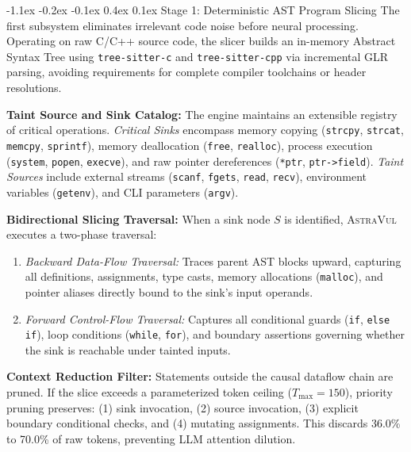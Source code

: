 \documentclass[10pt,twocolumn]{article}
\makeatletter
\renewcommand\subsection{\@startsection{subsection}{2}{\z@}%
  {-1.1ex \@plus -0.2ex \@minus -0.1ex}%
  {0.4ex \@plus 0.1ex}%
  {\normalfont\normalsize\bfseries}}
\makeatother
\begin{document}
\subsection{Stage 1: Deterministic AST Program Slicing}
The first subsystem eliminates irrelevant code noise before neural processing. Operating on raw C/C++ source code, the slicer builds an in-memory Abstract Syntax Tree using \texttt{tree-sitter-c} and \texttt{tree-sitter-cpp} via incremental GLR parsing, avoiding requirements for complete compiler toolchains or header resolutions.

\vspace{1pt}\noindent\textbf{Taint Source and Sink Catalog:}
The engine maintains an extensible registry of critical operations. \textit{Critical Sinks} encompass memory copying (\texttt{strcpy}, \texttt{strcat}, \texttt{memcpy}, \texttt{sprintf}), memory deallocation (\texttt{free}, \texttt{realloc}), process execution (\texttt{system}, \texttt{popen}, \texttt{execve}), and raw pointer dereferences (\texttt{*ptr}, \texttt{ptr->field}). \textit{Taint Sources} include external streams (\texttt{scanf}, \texttt{fgets}, \texttt{read}, \texttt{recv}), environment variables (\texttt{getenv}), and CLI parameters (\texttt{argv}).

\vspace{1pt}\noindent\textbf{Bidirectional Slicing Traversal:}
When a sink node $S$ is identified, \textsc{AstraVul} executes a two-phase traversal:
\begin{enumerate}[leftmargin=9pt,topsep=1pt,itemsep=0.5pt]
    \item \textit{Backward Data-Flow Traversal:} Traces parent AST blocks upward, capturing all definitions, assignments, type casts, memory allocations (\texttt{malloc}), and pointer aliases directly bound to the sink's input operands.
    \item \textit{Forward Control-Flow Traversal:} Captures all conditional guards (\texttt{if}, \texttt{else if}), loop conditions (\texttt{while}, \texttt{for}), and boundary assertions governing whether the sink is reachable under tainted inputs.
\end{enumerate}

\vspace{1pt}\noindent\textbf{Context Reduction Filter:}
Statements outside the causal dataflow chain are pruned. If the slice exceeds a parameterized token ceiling ($T_{\max} = 150$), priority pruning preserves: (1) sink invocation, (2) source invocation, (3) explicit boundary conditional checks, and (4) mutating assignments. This discards 36.0\% to 70.0\% of raw tokens, preventing LLM attention dilution.
\end{document}
